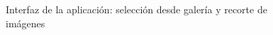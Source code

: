 \begin{figure}[!ht]
 	\caption{Interfaz de la aplicación: selección desde galería y recorte de imágenes}
 	\label{fig:diagnostico}
 \end{figure}
 
